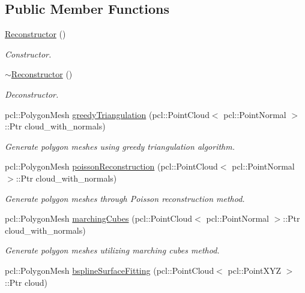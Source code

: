 \subsection*{Public Member Functions}
\begin{DoxyCompactItemize}
\item 
\hyperlink{classhull__abstraction_1_1_reconstructor_a621404f6ce3a4515adf85491543ace34}{Reconstructor} ()
\begin{DoxyCompactList}\small\item\em Constructor. \end{DoxyCompactList}\item 
\hyperlink{classhull__abstraction_1_1_reconstructor_a0db70f08234b090c7a5c58872dbd16c4}{$\sim$\+Reconstructor} ()
\begin{DoxyCompactList}\small\item\em Deconstructor. \end{DoxyCompactList}\item 
pcl\+::\+Polygon\+Mesh \hyperlink{classhull__abstraction_1_1_reconstructor_a585b9418c1a64ec21c195c72139ce581}{greedy\+Triangulation} (pcl\+::\+Point\+Cloud$<$ pcl\+::\+Point\+Normal $>$\+::Ptr cloud\+\_\+with\+\_\+normals)
\begin{DoxyCompactList}\small\item\em Generate polygon meshes using greedy triangulation algorithm. \end{DoxyCompactList}\item 
pcl\+::\+Polygon\+Mesh \hyperlink{classhull__abstraction_1_1_reconstructor_a9b7e8bda9c001e4d2eab2712e2b57f04}{poisson\+Reconstruction} (pcl\+::\+Point\+Cloud$<$ pcl\+::\+Point\+Normal $>$\+::Ptr cloud\+\_\+with\+\_\+normals)
\begin{DoxyCompactList}\small\item\em Generate polygon meshes through Poisson reconstruction method. \end{DoxyCompactList}\item 
pcl\+::\+Polygon\+Mesh \hyperlink{classhull__abstraction_1_1_reconstructor_a41a0fa653923a21b3329b747f0c6943b}{marching\+Cubes} (pcl\+::\+Point\+Cloud$<$ pcl\+::\+Point\+Normal $>$\+::Ptr cloud\+\_\+with\+\_\+normals)
\begin{DoxyCompactList}\small\item\em Generate polygon meshes utilizing marching cubes method. \end{DoxyCompactList}\item 
pcl\+::\+Polygon\+Mesh \hyperlink{classhull__abstraction_1_1_reconstructor_a531c5dc53b28b4f1e48a318db1acea90}{bspline\+Surface\+Fitting} (pcl\+::\+Point\+Cloud$<$ pcl\+::\+Point\+X\+YZ $>$\+::Ptr cloud)

\end{DoxyCompactItemize}
